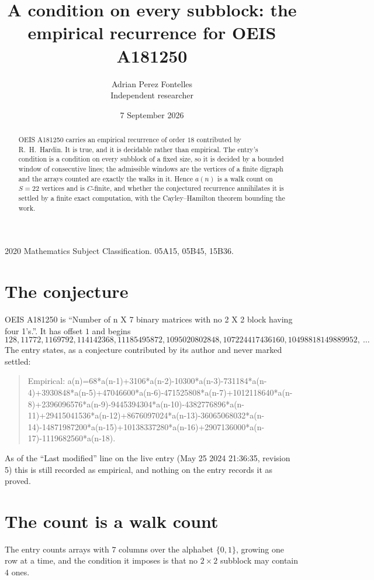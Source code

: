 \documentclass[11pt,a4paper]{article}
\title{A condition on every subblock: the empirical recurrence for OEIS A181250}
\author{Adrian Perez Fontelles\\ \small Independent researcher}
\date{7 September 2026}
\theoremstyle{plain}
\theoremstyle{definition}
\begin{document}
\maketitle

\begin{abstract}
OEIS A181250 carries an empirical recurrence of order $18$ contributed by R.~H.~Hardin. It is
true, and it is decidable rather than empirical. The entry's condition is a condition on every
subblock of a fixed size, so it is decided by a bounded window of consecutive lines; the
admissible windows are the vertices of a finite digraph and the arrays counted are exactly the
walks in it. Hence $a(n)$ is a walk count on $S=22$ vertices and is $C$-finite, and whether the
conjectured recurrence annihilates it is settled by a finite exact computation, with the
Cayley--Hamilton theorem bounding the work.
\end{abstract}

\noindent\small 2020 Mathematics Subject Classification. 05A15, 05B45, 15B36.\normalsize

\section{The conjecture}

OEIS A181250 is ``Number of n X 7 binary matrices with no 2 X 2 block having four 1's.''. It has offset $1$ and begins
\[
128, 11772, 1169792, 114142368, 11185495872, 1095020802848, 107224417436160, 10498818149889952,\ \dots
\]
The entry states, as a conjecture contributed by its author and never marked settled:
\begin{quote}
Empirical: a(n)=68*a(n-1)+3106*a(n-2)-10300*a(n-3)-731184*a(n-4)+3930848*a(n-5)+47046600*a(n-6)-471525808*a(n-7)+1012118640*a(n-8)+2396096576*a(n-9)-9445394304*a(n-10)-4382776896*a(n-11)+29415041536*a(n-12)+8676097024*a(n-13)-36065068032*a(n-14)-14871987200*a(n-15)+10138337280*a(n-16)+2907136000*a(n-17)-1119682560*a(n-18).
\end{quote}
As of the ``Last modified'' line on the live entry (May 25 2024 21:36:35, revision 5) this is still
recorded as empirical, and nothing on the entry records it as proved.

\section{The count is a walk count}

The entry counts arrays with $7$ columns over the alphabet $\{0,1\}$, growing one row at a time, and the condition it imposes is that no $2\times2$ subblock may contain $4$ ones.
\end{document}
